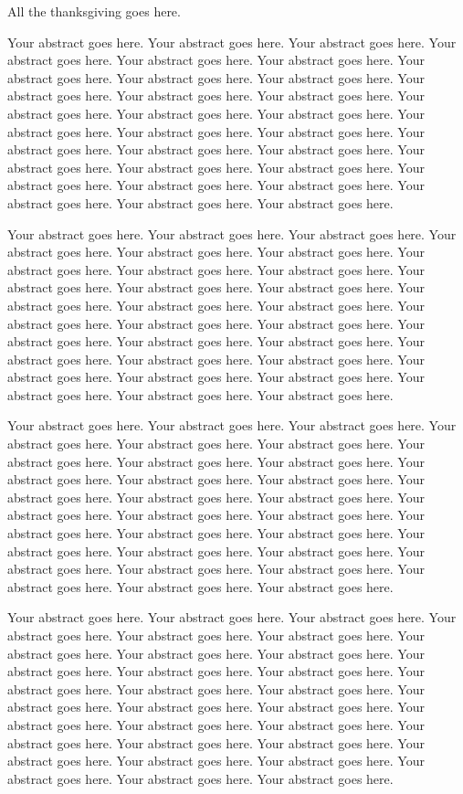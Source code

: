 \label{sec:ack}

All the thanksgiving goes here.


Your abstract goes here. Your abstract goes here. Your abstract goes here. Your abstract goes here. Your abstract goes here. Your abstract goes here. Your abstract goes here. Your abstract goes here. Your abstract goes here. Your abstract goes here. Your abstract goes here. Your abstract goes here. Your abstract goes here. Your abstract goes here. Your abstract goes here. Your abstract goes here. Your abstract goes here. Your abstract goes here. Your abstract goes here. Your abstract goes here. Your abstract goes here. Your abstract goes here. Your abstract goes here. Your abstract goes here. Your abstract goes here. Your abstract goes here. Your abstract goes here. Your abstract goes here. Your abstract goes here. Your abstract goes here. 

Your abstract goes here. Your abstract goes here. Your abstract goes here. Your abstract goes here. Your abstract goes here. Your abstract goes here. Your abstract goes here. Your abstract goes here. Your abstract goes here. Your abstract goes here. Your abstract goes here. Your abstract goes here. Your abstract goes here. Your abstract goes here. Your abstract goes here. Your abstract goes here. Your abstract goes here. Your abstract goes here. Your abstract goes here. Your abstract goes here. Your abstract goes here. Your abstract goes here. Your abstract goes here. Your abstract goes here. Your abstract goes here. Your abstract goes here. Your abstract goes here. Your abstract goes here. Your abstract goes here. Your abstract goes here. 

Your abstract goes here. Your abstract goes here. Your abstract goes here. Your abstract goes here. Your abstract goes here. Your abstract goes here. Your abstract goes here. Your abstract goes here. Your abstract goes here. Your abstract goes here. Your abstract goes here. Your abstract goes here. Your abstract goes here. Your abstract goes here. Your abstract goes here. Your abstract goes here. Your abstract goes here. Your abstract goes here. Your abstract goes here. Your abstract goes here. Your abstract goes here. Your abstract goes here. Your abstract goes here. Your abstract goes here. Your abstract goes here. Your abstract goes here. Your abstract goes here. Your abstract goes here. Your abstract goes here. Your abstract goes here. 

Your abstract goes here. Your abstract goes here. Your abstract goes here. Your abstract goes here. Your abstract goes here. Your abstract goes here. Your abstract goes here. Your abstract goes here. Your abstract goes here. Your abstract goes here. Your abstract goes here. Your abstract goes here. Your abstract goes here. Your abstract goes here. Your abstract goes here. Your abstract goes here. Your abstract goes here. Your abstract goes here. Your abstract goes here. Your abstract goes here. Your abstract goes here. Your abstract goes here. Your abstract goes here. Your abstract goes here. Your abstract goes here. Your abstract goes here. Your abstract goes here. Your abstract goes here. Your abstract goes here. Your abstract goes here. 


